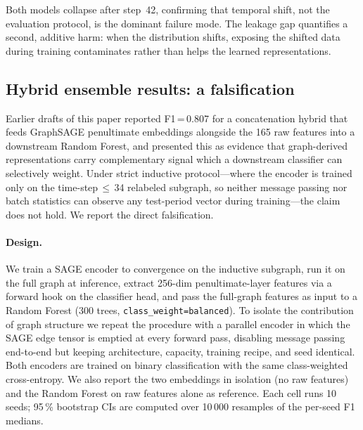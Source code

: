 Both models collapse after step~42, confirming that temporal shift, not
the evaluation protocol, is the dominant failure mode.  The leakage gap
quantifies a second, additive harm: when the distribution shifts,
exposing the shifted data during training contaminates rather than
helps the learned representations.

\FloatBarrier
\subsection{Hybrid ensemble results: a falsification}
\label{sec:hybrid_results}

Earlier drafts of this paper reported F1\,=\,0.807 for a concatenation
hybrid that feeds GraphSAGE penultimate embeddings alongside the 165
raw features into a downstream Random Forest, and presented this as
evidence that graph-derived representations carry complementary signal
which a downstream classifier can selectively weight.  Under strict
inductive protocol---where the encoder is trained only on the
time-step\,$\le$\,34 relabeled subgraph, so neither message passing nor
batch statistics can observe any test-period vector during
training---the claim does not hold.  We report the direct
falsification.

\paragraph{Design.}  We train a SAGE encoder to convergence on the
inductive subgraph, run it on the full graph at inference, extract
256-dim penultimate-layer features via a forward hook on the
classifier head, and pass the full-graph features as input to a
Random Forest (300 trees, \texttt{class\_weight=balanced}).  To
isolate the contribution of graph structure we repeat the procedure
with a parallel encoder in which the SAGE edge tensor is emptied at
every forward pass, disabling message passing end-to-end but keeping
architecture, capacity, training recipe, and seed identical.  Both
encoders are trained on binary classification with the same
class-weighted cross-entropy.  We also report the two embeddings in
isolation (no raw features) and the Random Forest on raw features
alone as reference.  Each cell runs 10 seeds; 95\,\% bootstrap CIs
are computed over 10\,000 resamples of the per-seed F1 medians.

